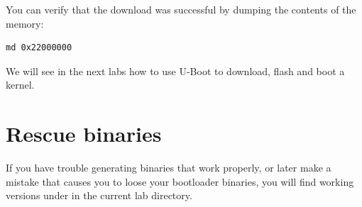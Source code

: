 You can verify that the download was successful by dumping the
contents of the memory:

\begin{verbatim}
md 0x22000000
\end{verbatim}

We will see in the next labs how to use U-Boot to download, flash and
boot a kernel.

\section{Rescue binaries}

If you have trouble generating binaries that work properly, or later
make a mistake that causes you to loose your bootloader binaries, you
will find working versions under  in the current lab
directory.
